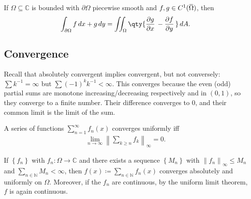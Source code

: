 \begin{theorem}

If \(\Omega \subseteq {\mathbb{C}}\) is bounded with
\({{\partial}}\Omega\) piecewise smooth and
\(f, g\in C^1(\mkern 1.5mu\overline{\mkern-1.5mu\Omega\mkern-1.5mu}\mkern 1.5mu)\),
then
\begin{align*}\int_{{{\partial}}\Omega} f\, dx + g\, dy = \iint_{\Omega} \qty{ {\frac{\partial g}{\partial x}\,} - {\frac{\partial f}{\partial y}\,} } \, dA.\end{align*}

\end{theorem}

\hypertarget{convergence}{%
\subsection{Convergence}\label{convergence}}

\begin{remark}

Recall that absolutely convergent implies convergent, but not
conversely: \(\sum k^{-1}= \infty\) but \(\sum (-1)^k k^{-1}< \infty\).
This converges because the even (odd) partial sums are monotone
increasing/decreasing respectively and in \((0, 1)\), so they converge
to a finite number. Their difference converges to 0, and their common
limit is the limit of the sum.

\end{remark}

\begin{proposition}

A series of functions \(\sum_{n=1}^\infty f_n(x)\) converges uniformly
iff
\begin{align*}  
\lim_{n\to \infty} {\left\lVert { \sum_{k\geq n} f_k } \right\rVert}_\infty = 0
.\end{align*}

\end{proposition}

\begin{theorem}

If \(\left\{{f_n}\right\}\) with \(f_n: \Omega \to {\mathbb{C}}\) and
there exists a sequence \(\left\{{M_n}\right\}\) with
\({\left\lVert {f_n} \right\rVert}_\infty \leq M_n\) and
\(\sum_{n\in {\mathbb{N}}} M_n < \infty\), then
\(f(x) \coloneqq\sum_{n\in {\mathbb{N}}} f_n(x)\) converges absolutely
and uniformly on \(\Omega\). Moreover, if the \(f_n\) are continuous, by
the uniform limit theorem, \(f\) is again continuous.

\end{theorem}

